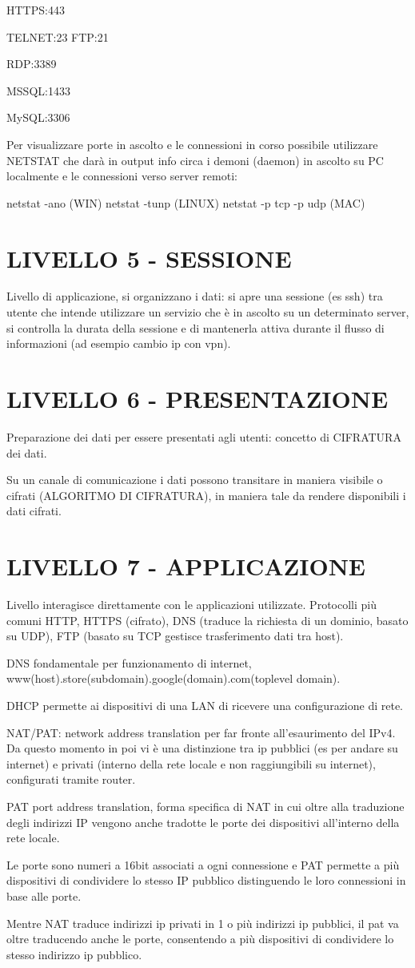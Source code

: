 \documentclass{article}
\begin{document}
HTTPS:443

TELNET:23
FTP:21

RDP:3389

MSSQL:1433

MySQL:3306


Per visualizzare porte in ascolto e le connessioni in corso possibile utilizzare NETSTAT che darà in output info circa i demoni (daemon) in ascolto su PC localmente e le connessioni verso server remoti:

netstat -ano (WIN)
netstat -tunp (LINUX)
netstat -p tcp -p udp (MAC)

\section{LIVELLO 5 - SESSIONE}
Livello di applicazione, si organizzano i dati: si apre una sessione (es ssh) tra utente che intende utilizzare un servizio che è in ascolto su un determinato server, si controlla la durata della sessione e di mantenerla attiva durante il flusso di informazioni (ad esempio cambio ip con vpn).

\section{LIVELLO 6 - PRESENTAZIONE}
Preparazione dei dati per essere presentati agli utenti: concetto di CIFRATURA dei dati.

Su un canale di comunicazione i dati possono transitare in maniera visibile o cifrati (ALGORITMO DI CIFRATURA), in maniera tale da rendere disponibili i dati cifrati.

\section{LIVELLO 7 - APPLICAZIONE}

Livello interagisce direttamente con le applicazioni utilizzate. Protocolli più comuni HTTP, HTTPS (cifrato), DNS (traduce la richiesta di un dominio, basato su UDP), FTP (basato su TCP gestisce trasferimento dati tra host).

DNS fondamentale per funzionamento di internet, www(host).store(subdomain).google(domain).com(toplevel domain).

DHCP permette ai dispositivi di una LAN di ricevere una configurazione di rete.

NAT/PAT: network address translation per far fronte all'esaurimento del IPv4. Da questo momento in poi vi è una distinzione tra ip pubblici (es per andare su internet) e privati (interno della rete locale e non raggiungibili su internet), configurati tramite router.

PAT port address translation, forma specifica di NAT in cui oltre alla traduzione degli indirizzi IP vengono anche tradotte le porte dei dispositivi all'interno della rete locale.

Le porte sono numeri a 16bit associati a ogni connessione e PAT permette a più dispositivi di condividere lo stesso IP pubblico distinguendo le loro connessioni in base alle porte.

Mentre NAT traduce indirizzi ip privati in 1 o più indirizzi ip pubblici, il pat va oltre traducendo anche le porte, consentendo a più dispositivi di condividere lo stesso indirizzo ip pubblico.
\end{document}
